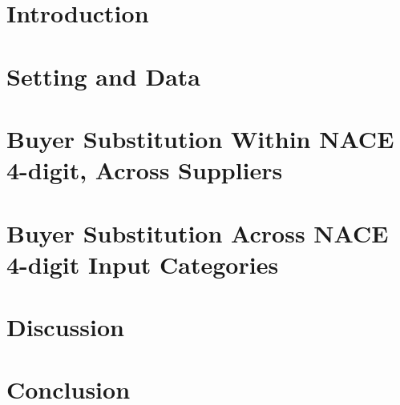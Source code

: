 \documentclass[11pt, reqno]{amsart}
\theoremstyle{definition}
\begin{document}
\maketitle

\pagebreak

\section{Introduction}\label{sec:introduction}


\section{Setting and Data}\label{sec:data}


\section{Buyer Substitution Within NACE 4-digit, Across Suppliers}\label{sec:test_h}


\section{Buyer Substitution Across NACE 4-digit Input Categories}\label{sec:test_i}


\section{Discussion}\label{sec:discussion}


\section{Conclusion}\label{sec:conclusion}


\newpage



\newpage
\appendix

\end{document}
